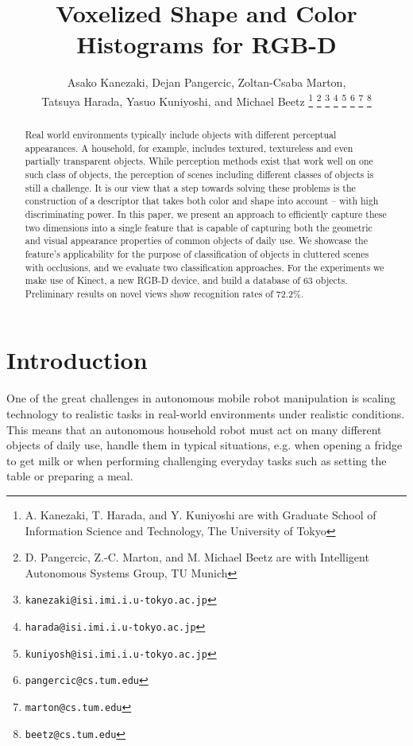 \documentclass[letterpaper, 10 pt, conference]{sty/ieeeconf}
\title{\LARGE \bf Voxelized Shape and Color Histograms for RGB-D}
\author{Asako Kanezaki, Dejan Pangercic, Zoltan-Csaba Marton, \\ Tatsuya Harada, Yasuo Kuniyoshi, and Michael Beetz%
\thanks{A. Kanezaki, T. Harada, and Y. Kuniyoshi are with Graduate School of Information Science and Technology, The University of Tokyo
}
\thanks{D. Pangercic, Z.-C. Marton, and M. Michael Beetz are with Intelligent Autonomous Systems Group, TU Munich
}
\thanks{\tt\small kanezaki@isi.imi.i.u-tokyo.ac.jp}
\thanks{\tt\small harada@isi.imi.i.u-tokyo.ac.jp}
\thanks{\tt\small kuniyosh@isi.imi.i.u-tokyo.ac.jp}
\thanks{\tt\small pangercic@cs.tum.edu}
\thanks{\tt\small marton@cs.tum.edu}
\thanks{\tt\small beetz@cs.tum.edu}
}
\begin{document}
\newcommand{\todo}[1]{\textbf{\textcolor{red}{TODO: #1}}}
\maketitle
\thispagestyle{empty}
\pagestyle{empty}

\begin{abstract}
Real world environments typically include objects with different perceptual appearances.
A household, for example, includes textured, textureless and even partially transparent objects.
While perception methods exist that work well on one such class of objects, the perception of
scenes including different classes of objects is still a challenge.
It is our view that a step towards solving these problems is the
construction of a descriptor that takes both color and shape
into account -- with high discriminating power.
In this paper, we
present an approach to efficiently capture these two dimensions
into a single feature
that is capable of capturing both the geometric and visual appearance
properties of common objects of daily use. We showcase the
feature's applicability for the purpose of classification of objects in cluttered scenes with occlusions,
and we evaluate two classification approaches.
For the experiments we make use of Kinect, a new RGB-D device,
and build a database of 63 objects. Preliminary results
on novel views show recognition rates of 72.2\%.
\end{abstract}


\section{Introduction}
One of the great challenges in autonomous mobile robot manipulation is scaling
technology to realistic tasks in real-world environments under realistic
conditions. This means that an autonomous household robot must act on many
different objects of daily use, handle them in typical situations, e.g. when
opening a fridge to get milk or when performing challenging everyday tasks
such as setting the table or preparing a meal.
\end{document}
